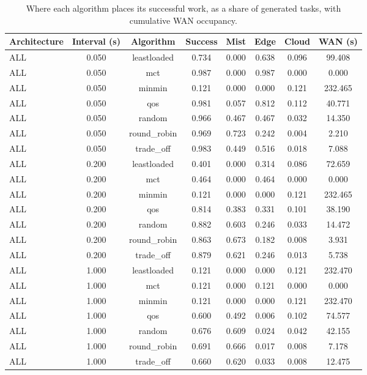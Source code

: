\begin{table}
\centering
\scriptsize
\caption{Where each algorithm places its successful work, as a share of generated tasks, with cumulative WAN occupancy.}
\label{tab:p1-host-selection}
\begin{tabular}{lccccccc}
\toprule
Architecture & Interval (s) & Algorithm & Success & Mist & Edge & Cloud & WAN (s) \\
\midrule
ALL & 0.050 & leastloaded & 0.734 & 0.000 & 0.638 & 0.096 & 99.408 \\
ALL & 0.050 & mct & 0.987 & 0.000 & 0.987 & 0.000 & 0.000 \\
ALL & 0.050 & minmin & 0.121 & 0.000 & 0.000 & 0.121 & 232.465 \\
ALL & 0.050 & qos & 0.981 & 0.057 & 0.812 & 0.112 & 40.771 \\
ALL & 0.050 & random & 0.966 & 0.467 & 0.467 & 0.032 & 14.350 \\
ALL & 0.050 & round\_robin & 0.969 & 0.723 & 0.242 & 0.004 & 2.210 \\
ALL & 0.050 & trade\_off & 0.983 & 0.449 & 0.516 & 0.018 & 7.088 \\
ALL & 0.200 & leastloaded & 0.401 & 0.000 & 0.314 & 0.086 & 72.659 \\
ALL & 0.200 & mct & 0.464 & 0.000 & 0.464 & 0.000 & 0.000 \\
ALL & 0.200 & minmin & 0.121 & 0.000 & 0.000 & 0.121 & 232.465 \\
ALL & 0.200 & qos & 0.814 & 0.383 & 0.331 & 0.101 & 38.190 \\
ALL & 0.200 & random & 0.882 & 0.603 & 0.246 & 0.033 & 14.472 \\
ALL & 0.200 & round\_robin & 0.863 & 0.673 & 0.182 & 0.008 & 3.931 \\
ALL & 0.200 & trade\_off & 0.879 & 0.621 & 0.246 & 0.013 & 5.738 \\
ALL & 1.000 & leastloaded & 0.121 & 0.000 & 0.000 & 0.121 & 232.470 \\
ALL & 1.000 & mct & 0.121 & 0.000 & 0.121 & 0.000 & 0.000 \\
ALL & 1.000 & minmin & 0.121 & 0.000 & 0.000 & 0.121 & 232.470 \\
ALL & 1.000 & qos & 0.600 & 0.492 & 0.006 & 0.102 & 74.577 \\
ALL & 1.000 & random & 0.676 & 0.609 & 0.024 & 0.042 & 42.155 \\
ALL & 1.000 & round\_robin & 0.691 & 0.666 & 0.017 & 0.008 & 7.178 \\
ALL & 1.000 & trade\_off & 0.660 & 0.620 & 0.033 & 0.008 & 12.475 \\

\end{tabular}
\end{table}
